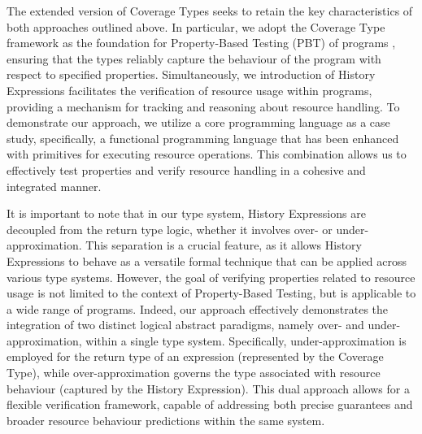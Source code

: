 The extended version of Coverage Types seeks to retain the key characteristics of both approaches outlined above. In particular, we adopt the Coverage Type framework as the foundation for Property-Based Testing (PBT) of programs \cite{PBT1,PBT2}, ensuring that the types reliably capture the behaviour of the program with respect to specified properties. Simultaneously, we introduction of History Expressions facilitates the verification of resource usage within programs, providing a mechanism for tracking and reasoning about resource handling. To demonstrate our approach, we utilize a core programming language as a case study, specifically, a functional programming language that has been enhanced with primitives for executing resource operations. This combination allows us to effectively test properties and verify resource handling in a cohesive and integrated manner.

It is important to note that in our type system, History Expressions are decoupled from the return type logic, whether it involves over- or under-approximation. This separation is a crucial feature, as it allows History Expressions to behave as a versatile formal technique that can be applied across various type systems. However, the goal of verifying properties related to resource usage is not limited to the context of Property-Based Testing, but is applicable to a wide range of programs. Indeed, our approach effectively demonstrates the integration of two distinct logical abstract paradigms, namely over- and under-approximation, within a single type system. Specifically, under-approximation is employed for the return type of an expression (represented by the Coverage Type), while over-approximation governs the type associated with resource behaviour (captured by the History Expression). This dual approach allows for a flexible verification framework, capable of addressing both precise guarantees and broader resource behaviour predictions within the same system.

